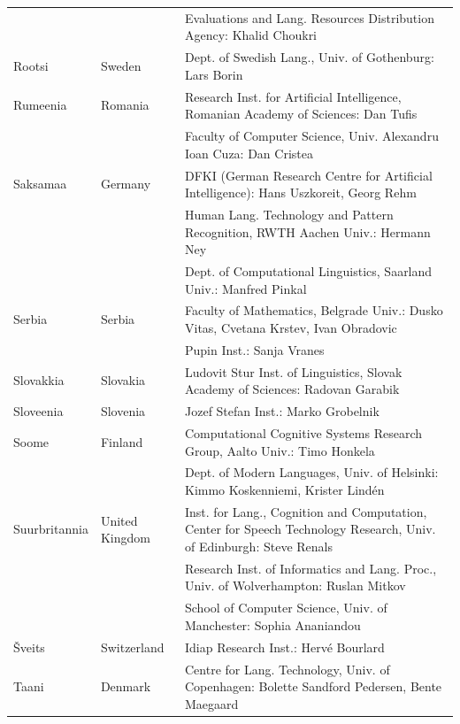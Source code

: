 \begin{longtable}{llp{105mm}}
  & & Evaluations and Lang. Resources Distribution Agency: Khalid Choukri\\ \addlinespace 
  Rootsi & \textcolor{grey1}{Sweden} & Dept. of Swedish Lang., Univ. of Gothenburg: Lars Borin \\ \addlinespace 
  Rumeenia & \textcolor{grey1}{Romania} & Research Inst. for Artificial Intelligence, Romanian Academy of Sciences: Dan Tufis \\ \addlinespace
  & & Faculty of Computer Science, Univ. Alexandru Ioan Cuza: Dan Cristea \\ \addlinespace
  Saksamaa & \textcolor{grey1}{Germany} & DFKI (German Research Centre for Artificial Intelligence): Hans Uszkoreit, Georg Rehm\\ \addlinespace
  & & Human Lang. Technology and Pattern Recognition, RWTH Aachen Univ.: Hermann Ney \\ \addlinespace
  & & Dept. of Computational Linguistics, Saarland Univ.: Manfred Pinkal\\ 
 \addlinespace  
  Serbia & \textcolor{grey1}{Serbia} & Faculty of Mathematics, Belgrade Univ.: Dusko Vitas, Cvetana Krstev, Ivan Obradovic \\ \addlinespace
  & & Pupin Inst.: Sanja Vranes \\ \addlinespace  
  Slovakkia & \textcolor{grey1}{Slovakia} & Ludovit Stur Inst. of Linguistics, Slovak Academy of Sciences: Radovan Garabik \\ \addlinespace 
  Sloveenia & \textcolor{grey1}{Slovenia} & Jozef Stefan Inst.: Marko Grobelnik \\ \addlinespace 
  Soome & \textcolor{grey1}{Finland} & Computational Cognitive Systems Research Group, Aalto Univ.: Timo Honkela\\ \addlinespace
  & & Dept. of Modern Languages, Univ. of Helsinki: Kimmo Koskenniemi, Krister Lindén \\ \addlinespace
  Suurbritannia & \textcolor{grey1}{United Kingdom} & Inst. for Lang., Cognition and Computation, Center for Speech Technology Research, Univ. of Edinburgh: Steve Renals \\ \addlinespace 
  & & Research Inst. of Informatics and Lang. Proc., Univ. of Wolverhampton: Ruslan Mitkov \\ \addlinespace 
  & & School of Computer Science, Univ. of Manchester: Sophia Ananiandou \\ \addlinespace 
  Šveits & \textcolor{grey1}{Switzerland} & Idiap Research Inst.: Hervé Bourlard \\ 
\addlinespace Taani &  \textcolor{grey1}{Denmark} & Centre for Lang. Technology, Univ. of Copenhagen: Bolette Sandford Pedersen, Bente Maegaard\\

\end{longtable}
